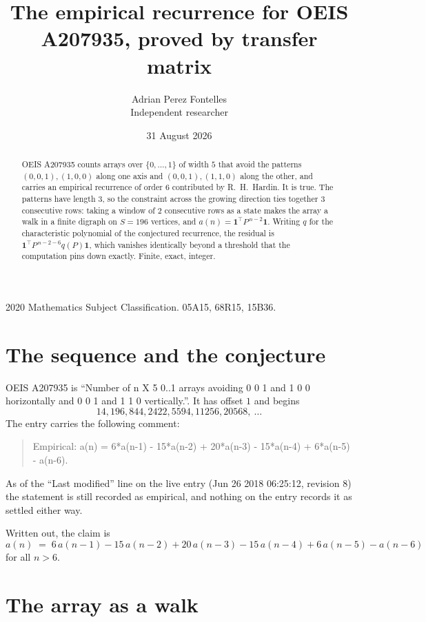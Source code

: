 \documentclass[11pt,a4paper]{article}
\title{The empirical recurrence for OEIS A207935, proved by transfer matrix}
\author{Adrian Perez Fontelles\\ \small Independent researcher}
\date{31 August 2026}
\theoremstyle{plain}
\theoremstyle{definition}
\begin{document}
\maketitle

\begin{abstract}
OEIS A207935 counts arrays over $\{0,\dots,1\}$ of width $5$ that avoid the patterns
$(0,0,1), (1,0,0)$ along one axis and $(0,0,1), (1,1,0)$ along the other, and carries an empirical recurrence of
order $6$ contributed by R.~H.~Hardin. It is true. The patterns have length $3$, so
the constraint across the growing direction ties together $3$ consecutive rows: taking a
window of $2$ consecutive rows as a state makes the array a walk in a finite digraph
on $S=196$ vertices, and $a(n)=\mathbf{1}^{\!\top}P^{\,n-2}\mathbf{1}$. Writing $q$
for the characteristic polynomial of the conjectured recurrence, the residual is
$\mathbf{1}^{\!\top}P^{\,n-2-6}q(P)\mathbf{1}$, which vanishes identically
beyond a threshold that the computation pins down exactly. Finite, exact, integer.
\end{abstract}

\noindent\small 2020 Mathematics Subject Classification. 05A15, 68R15, 15B36.\normalsize

\section{The sequence and the conjecture}

OEIS A207935 is ``Number of n X 5 0..1 arrays avoiding 0 0 1 and 1 0 0 horizontally and 0 0 1 and 1 1 0 vertically.''. It has offset
$1$ and begins
\[
14, 196, 844, 2422, 5594, 11256, 20568,\ \dots
\]
The entry carries the following comment:
\begin{quote}\small
Empirical: a(n) = 6*a(n-1) - 15*a(n-2) + 20*a(n-3) - 15*a(n-4) + 6*a(n-5) - a(n-6).
\end{quote}
As of the ``Last modified'' line on the live entry (Jun 26 2018 06:25:12, revision
8) the statement is still recorded as empirical, and nothing on the entry
records it as settled either way.

Written out, the claim is
\begin{equation}\label{eq:conj}
a(n)\;=\;6\,a(n-1) - 15\,a(n-2) + 20\,a(n-3) - 15\,a(n-4) + 6\,a(n-5) - a(n-6)
\end{equation}
for all $n>6$. 

\section{The array as a walk}
\end{document}

